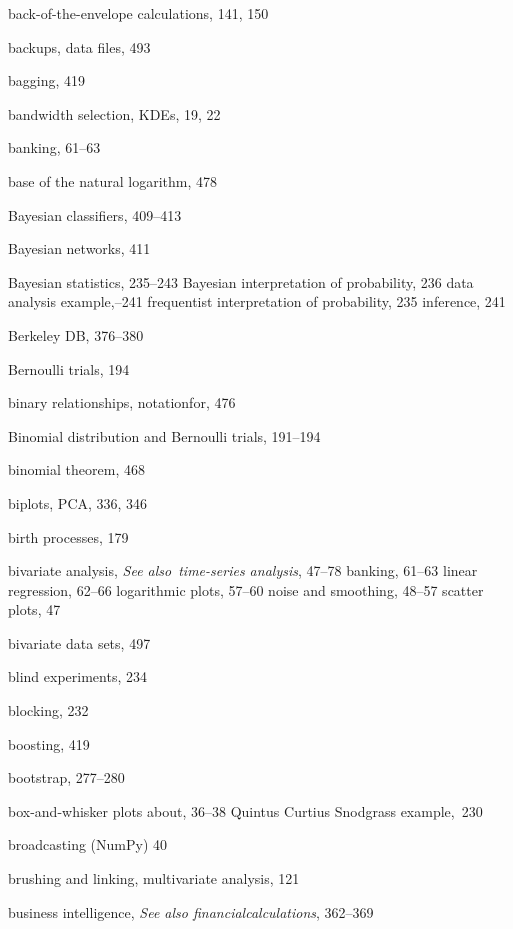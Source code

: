\documentclass{Oreilly5980006}
\def\seealso{{\it See also}\ }
\begin{document}
\begin{theindex}
  \item back-of-the-envelope calculations, 141, 150
  \item backups, data files, 493
  \item bagging, 419
  \item bandwidth selection, KDEs, 19, 22
  \item banking, 61--63
  \item base of the natural logarithm, 478
  \item Bayesian classifiers, 409--413
  \item Bayesian networks, 411
  \item Bayesian statistics, 235--243
    \subitem Bayesian interpretation of probability, 236
    \subitem data analysis example,--241
    \subitem frequentist interpretation of probability, 235
    \subitem inference, 241
  \item Berkeley DB, 376--380
  \item Bernoulli trials,  194
  \item binary relationships, notation\break for, 476
  \item Binomial distribution and Bernoulli trials, 191--194
  \item binomial theorem, 468
  \item biplots, PCA, 336, 346
  \item birth processes, 179
  \item bivariate analysis, \seealso{}{\it time-series analysis}, 47--78
    \subitem banking, 61--63
    \subitem linear regression, 62--66
    \subitem logarithmic plots, 57--60
    \subitem noise and smoothing, 48--57
    \subitem scatter plots, 47
  \item bivariate data sets, 497
  \item blind experiments, 234
  \item blocking, 232
  \item boosting, 419
  \item bootstrap, 277--280
  \item box-and-whisker plots
    \subitem about, 36--38
    \subitem Quintus Curtius Snodgrass example,~230
  \item broadcasting (NumPy) 40
  \item brushing and linking, multivariate analysis, 121
  \item business intelligence,  {\it See also financial\break calculations}, 
		362--369


\end{theindex}
\end{document}
